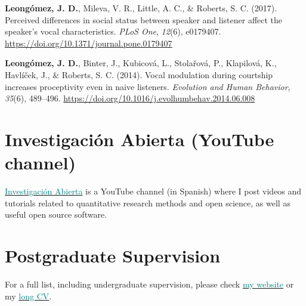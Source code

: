 \documentclass[11pt, a4paper]{awesome-cv}
\begin{document}
\leavevmode\hypertarget{ref-Leongomez2017}{}%
\textbf{Leongómez, J. D.}, Mileva, V. R., Little, A. C., \& Roberts, S.
C. (2017). {Perceived differences in social status between speaker and
listener affect the speaker's vocal characteristics}. \emph{PLoS One},
\emph{12}(6), e0179407.
\url{https://doi.org/10.1371/journal.pone.0179407}

\leavevmode\hypertarget{ref-Leongomez2014}{}%
\textbf{Leongómez, J. D.}, Binter, J., Kubicová, L., Stolařová, P.,
Klapilová, K., Havlíček, J., \& Roberts, S. C. (2014). {Vocal modulation
during courtship increases proceptivity even in naive listeners}.
\emph{Evolution and Human Behavior}, \emph{35}(6), 489--496.
\url{https://doi.org/10.1016/j.evolhumbehav.2014.06.008}

\endgroup

\hypertarget{investigaciuxf3n-abierta-youtube-channel}{%
\section{Investigación Abierta (YouTube
channel)}\label{investigaciuxf3n-abierta-youtube-channel}}

\href{https://www.youtube.com/user/juanleongomez/featured}{\textcolor{teal}{Investigación Abierta}}
is a YouTube channel (in Spanish) where I post videos and tutorials
related to quantitative research methods and open science, as well as
useful open source software.

\hypertarget{postgraduate-supervision}{%
\section{Postgraduate Supervision}\label{postgraduate-supervision}}

For a full list, including undergraduate supervision, please check
\href{https://jdleongomez.info/en/\#experience}{\textcolor{teal}{my website}}
or my
\href{https://jdleongomez.info/en/files/jdl_cv_en.pdf}{\textcolor{teal}{long CV}}.
\end{document}
